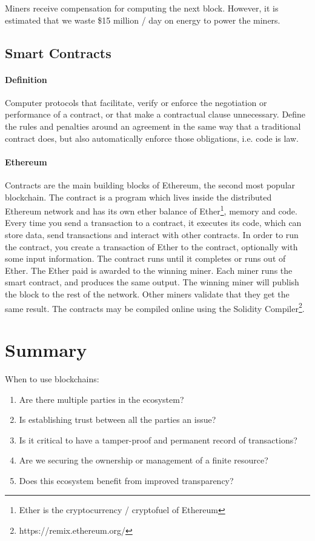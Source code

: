 \documentclass[twocolumn]{article}
\begin{document}
Miners receive compensation for computing the next block. However, it is estimated that we waste \$15 million / day on energy to power the miners.

\subsection{Smart Contracts}
\paragraph{Definition} Computer protocols that facilitate, verify or enforce the negotiation or performance of a contract, or that make a contractual clause unnecessary. Define the rules and penalties around an agreement in the same way that a traditional contract does, but also automatically enforce those obligations, i.e. code is law.

\paragraph{Ethereum} Contracts are the main building blocks of Ethereum, the second most popular blockchain.
The contract is a program which lives inside the distributed Ethereum network and has its own ether balance of Ether\footnote{Ether is the cryptocurrency / cryptofuel of Ethereum}, memory and code.
Every time you send a transaction to a contract, it executes its code, which can store data, send transactions and interact with other contracts.
In order to run the contract, you create a transaction of Ether to the contract, optionally with some input information.
The contract runs until it completes or runs out of Ether.
The Ether paid is awarded to the winning miner.
Each miner runs the smart contract, and produces the same output.
The winning miner will publish the block to the rest of the network.
Other miners validate that they get the same result.
The contracts may be compiled online using the Solidity Compiler\footnote{https://remix.ethereum.org/}.

\section{Summary}
When to use blockchains:
\begin{enumerate}
 \item Are there multiple parties in the ecosystem?
 \item Is establishing trust between all the parties an issue?
 \item Is it critical to have a tamper-proof and permanent record of transactions?
 \item Are we securing the ownership or management of a finite resource?
 \item Does this ecosystem benefit from improved transparency?
\end{enumerate}
\end{document}
